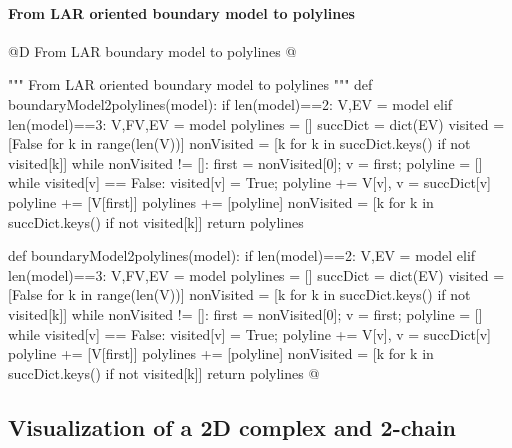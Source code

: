 \documentclass[11pt,oneside]{article}    %
\begin{document}
\paragraph{From LAR oriented boundary model to polylines}
@D From LAR boundary model to polylines
@{""" From LAR oriented boundary model to polylines """
def boundaryModel2polylines(model):
    if len(model)==2: V,EV = model
    elif len(model)==3: V,FV,EV = model
    polylines = []
    succDict = dict(EV)
    visited = [False for k in range(len(V))]
    nonVisited = [k for k in succDict.keys() if not visited[k]]
    while nonVisited != []:
        first = nonVisited[0]; v = first; polyline = []
        while visited[v] == False:
            visited[v] = True; 
            polyline += V[v], 
            v = succDict[v]
        polyline += [V[first]]
        polylines += [polyline]
        nonVisited = [k for k in succDict.keys() if not visited[k]]
    return polylines

def boundaryModel2polylines(model):
    if len(model)==2: V,EV = model
    elif len(model)==3: V,FV,EV = model
    polylines = []
    succDict = dict(EV)
    visited = [False for k in range(len(V))]
    nonVisited = [k for k in succDict.keys() if not visited[k]]
    while nonVisited != []:
        first = nonVisited[0]; v = first; polyline = []
        while visited[v] == False:
            visited[v] = True; 
            polyline += V[v], 
            v = succDict[v]
        polyline += [V[first]]
        polylines += [polyline]
        nonVisited = [k for k in succDict.keys() if not visited[k]]
    return polylines
@}





\subsection{Visualization of a 2D complex and 2-chain}
\end{document}
